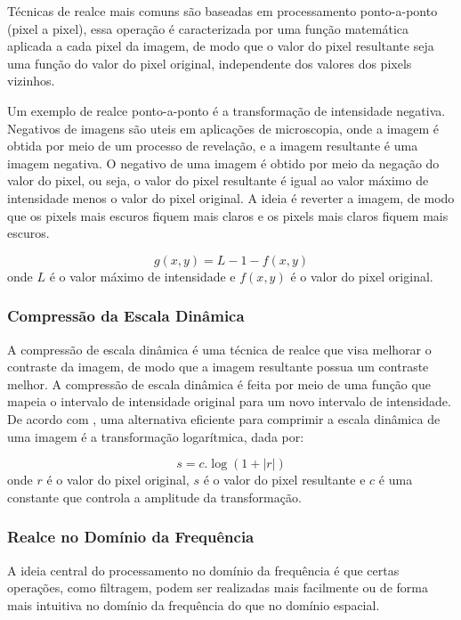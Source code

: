 \documentclass[conference]{IEEEtran}
\begin{document}
Técnicas de realce mais comuns são baseadas em processamento ponto-a-ponto (pixel a pixel), essa operação é 
caracterizada por uma função matemática aplicada a cada pixel da imagem, de modo que o valor do pixel resultante 
seja uma função do valor do pixel original, independente dos valores dos pixels vizinhos. 

Um exemplo de realce ponto-a-ponto é a transformação de intensidade negativa. Negativos de imagens são uteis em 
aplicações de microscopia, onde a imagem é obtida por meio de um processo de revelação, e a imagem resultante é 
uma imagem negativa. O negativo de uma imagem é obtido por meio da negação do valor do pixel, ou seja, o valor do 
pixel resultante é igual ao valor máximo de intensidade menos o valor do pixel original. 
A ideia é reverter a imagem, de modo que os pixels mais escuros fiquem mais claros e os pixels mais claros fiquem 
mais escuros.

\begin{equation}
g(x, y) = L - 1 - f(x, y)
\label{eq:neg_img}
\end{equation}
onde $L$ é o valor máximo de intensidade e $f(x,y)$ é o valor do pixel original.

\subsubsection{Compressão da Escala Dinâmica}

A compressão de escala dinâmica é uma técnica de realce que visa melhorar o contraste da imagem, 
de modo que a imagem resultante possua um contraste melhor. 
A compressão de escala dinâmica é feita por meio de uma função que mapeia o intervalo de intensidade original para 
um novo intervalo de intensidade. De acordo com \cite{gonzalez2000}, 
uma alternativa eficiente para comprimir a escala dinâmica de uma imagem é a transformação logarítmica, dada por:

\begin{equation}
s = c . \log(1 + |r|)
\label{eq:ecl_din}
\end{equation}
onde $r$ é o valor do pixel original, $s$ é o valor do pixel resultante e $c$ é uma constante que 
controla a amplitude da transformação.

\subsubsection{Realce no Domínio da Frequência}
A ideia central do processamento no domínio da frequência é que certas operações, como filtragem, 
podem ser realizadas mais facilmente ou de forma mais intuitiva no domínio da frequência do que no domínio espacial.
\cite{gonzalez2000}
\end{document}
